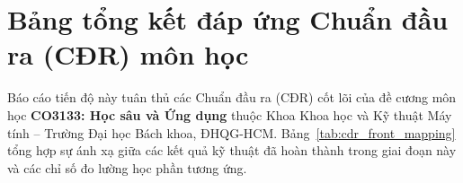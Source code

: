 \documentclass[12pt,a4paper]{article}
\begin{document}
\hypersetup{pageanchor=true}

\newpage
{}

\section*{Bảng tổng kết đáp ứng Chuẩn đầu ra (CĐR) môn học}

Báo cáo tiến độ này tuân thủ các Chuẩn đầu ra (CĐR) cốt lõi của đề cương môn học \textbf{CO3133: Học sâu và Ứng dụng} thuộc Khoa Khoa học và Kỹ thuật Máy tính -- Trường Đại học Bách khoa, ĐHQG-HCM. Bảng~\ref{tab:cdr_front_mapping} tổng hợp sự ánh xạ giữa các kết quả kỹ thuật đã hoàn thành trong giai đoạn này và các chỉ số đo lường học phần tương ứng.
\end{document}
